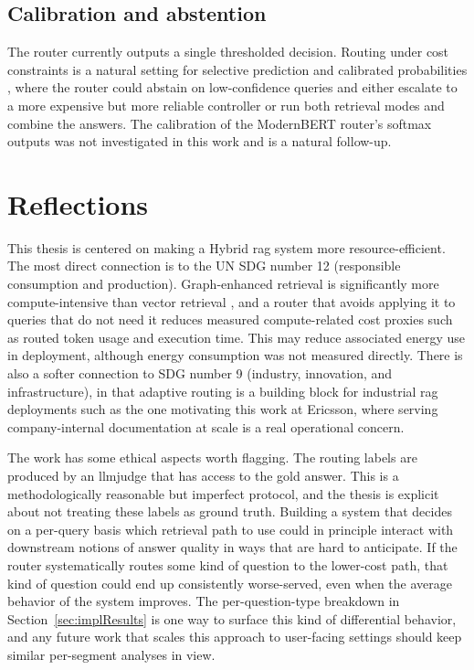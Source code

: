 \documentclass[english, bibtex]{kththesis}               %
\numberwithin{listing}{chapter}
\begin{document}
\subsection{Calibration and abstention}
\label{sec:limitCalibration}

The router currently outputs a single thresholded decision. Routing under cost constraints is a natural setting for selective prediction \cite{geifman2017selective} and calibrated probabilities \cite{guo2017calibration}, where the router could abstain on low-confidence queries and either escalate to a more expensive but more reliable controller or run both retrieval modes and combine the answers. The calibration of the ModernBERT router's softmax outputs was not investigated in this work and is a natural follow-up.

\section{Reflections}
\label{sec:reflections}

This thesis is centered on making a Hybrid \gls{rag} system more resource-efficient. The most direct connection is to the \gls{UN} \gls{SDG} number 12 (responsible consumption and production). Graph-enhanced retrieval is significantly more compute-intensive than vector retrieval \cite{lightrag2024,microsoft2024graphragcosts}, and a router that avoids applying it to queries that do not need it reduces measured compute-related cost proxies such as routed token usage and execution time. This may reduce associated energy use in deployment, although energy consumption was not measured directly. There is also a softer connection to \gls{SDG} number 9 (industry, innovation, and infrastructure), in that adaptive routing is a building block for industrial \gls{rag} deployments such as the one motivating this work at Ericsson, where serving company-internal documentation at scale is a real operational concern.

The work has some ethical aspects worth flagging. The routing labels are produced by an \gls{llmjudge} that has access to the gold answer. This is a methodologically reasonable but imperfect protocol, and the thesis is explicit about not treating these labels as ground truth. Building a system that decides on a per-query basis which retrieval path to use could in principle interact with downstream notions of answer quality in ways that are hard to anticipate. If the router systematically routes some kind of question to the lower-cost path, that kind of question could end up consistently worse-served, even when the average behavior of the system improves. The per-question-type breakdown in Section~\ref{sec:implResults} is one way to surface this kind of differential behavior, and any future work that scales this approach to user-facing settings should keep similar per-segment analyses in view.
\end{document}
